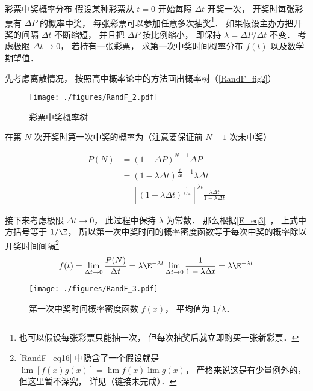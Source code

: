 \begin{example}{彩票中奖概率分布}
假设某种彩票从 $t = 0$ 开始每隔 $\Delta t$ 开奖一次， 开奖时每张彩票有 $\Delta P$ 的概率中奖， 每张彩票可以参加任意多次抽奖\footnote{也可以假设每张彩票只能抽一次， 但每次抽奖后就立即购买一张新彩票．}． 如果假设主办方把开奖的间隔 $\Delta t$ 不断缩短， 并且把 $\Delta P$ 按比例缩小， 即保持 $\lambda = {\Delta P}/{\Delta t}$ 不变． 考虑极限 $\Delta t\to 0$， 若持有一张彩票， 求第一次中奖时间概率分布 $f(t)$ 以及数学期望值．

先考虑离散情况， 按照高中概率论中的方法画出概率树（\autoref{RandF_fig2}）
\begin{figure}[ht]
\centering
\texttt{[image: ./figures/RandF\_2.pdf]}
\caption{彩票中奖概率树} \label{RandF_fig2}
\end{figure}
在第 $N$ 次开奖时第一次中奖的概率为（注意要保证前 $N-1$ 次未中奖）

\begin{equation}
\begin{aligned}
P(N) &= (1-\Delta P)^{N-1} \Delta P\\
&= (1-\lambda\Delta t)^{\frac{t}{\Delta t}-1} \lambda\Delta t\\
&= [(1-\lambda\Delta t)^{\frac{1}{\lambda\Delta t}}]^{\lambda t} \frac{\lambda\Delta t}{1-\lambda\Delta t}
\end{aligned}
\end{equation}

接下来考虑极限 $\Delta t\to 0$， 此过程中保持 $\lambda$ 为常数． 那么根据\autoref{E_eq3}~， 上式中方括号等于 $1/\E$， 所以第一次中奖时间的概率密度函数等于每次中奖的概率除以开奖时间间隔\footnote{\autoref{RandF_eq16} 中隐含了一个假设就是 $\lim [f(x)g(x)] = \lim f(x) \lim g(x)$， 严格来说这是有少量例外的， 但这里暂不深究， 详见（链接未完成）．}
\begin{equation}\label{RandF_eq16}
f(t) = \lim_{\Delta t\to 0} \frac{P(N)}{\Delta t} = \lambda\E^{-\lambda t}\lim_{\Delta t\to 0} \frac{1}{1-\lambda\Delta t} = \lambda\E^{-\lambda t}
\end{equation}


\begin{figure}[ht]
\centering
\texttt{[image: ./figures/RandF\_3.pdf]}
\caption{第一次中奖时间概率密度函数 $f(x)$， 平均值为 $1/\lambda$．} \label{RandF_fig3}
\end{figure}


\end{example}
